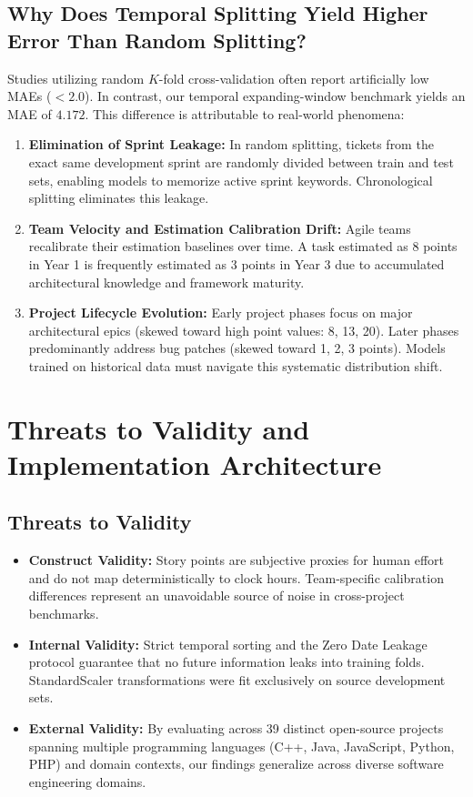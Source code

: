 \documentclass[11pt,a4paper]{article}
\begin{document}
\subsection{Why Does Temporal Splitting Yield Higher Error Than Random Splitting?}
Studies utilizing random $K$-fold cross-validation often report artificially low MAEs ($< 2.0$). In contrast, our temporal expanding-window benchmark yields an MAE of $4.172$. This difference is attributable to real-world phenomena:
\begin{enumerate}
    \item \textbf{Elimination of Sprint Leakage:} In random splitting, tickets from the exact same development sprint are randomly divided between train and test sets, enabling models to memorize active sprint keywords. Chronological splitting eliminates this leakage.
    \item \textbf{Team Velocity and Estimation Calibration Drift:} Agile teams recalibrate their estimation baselines over time. A task estimated as 8 points in Year 1 is frequently estimated as 3 points in Year 3 due to accumulated architectural knowledge and framework maturity.
    \item \textbf{Project Lifecycle Evolution:} Early project phases focus on major architectural epics (skewed toward high point values: 8, 13, 20). Later phases predominantly address bug patches (skewed toward 1, 2, 3 points). Models trained on historical data must navigate this systematic distribution shift.
\end{enumerate}

\section{Threats to Validity and Implementation Architecture}
\label{sec:threats}

\subsection{Threats to Validity}
\begin{itemize}
    \item \textbf{Construct Validity:} Story points are subjective proxies for human effort and do not map deterministically to clock hours. Team-specific calibration differences represent an unavoidable source of noise in cross-project benchmarks.
    \item \textbf{Internal Validity:} Strict temporal sorting and the Zero Date Leakage protocol guarantee that no future information leaks into training folds. StandardScaler transformations were fit exclusively on source development sets.
    \item \textbf{External Validity:} By evaluating across 39 distinct open-source projects spanning multiple programming languages (C++, Java, JavaScript, Python, PHP) and domain contexts, our findings generalize across diverse software engineering domains.
\end{itemize}
\end{document}
